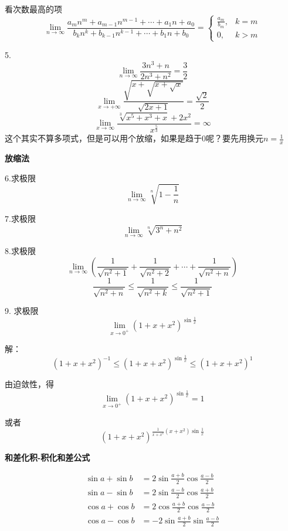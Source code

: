 \documentclass[12pt, a4paper]{ctexart}
\begin{document}
\begin{flushleft}
    看次数最高的项
    \[
    \lim _{n \rightarrow \infty} \frac{a_{m} n^{m}+a_{m-1} n^{m-1}+\cdots+a_{1} n+a_{0}}{b_{k} n^{k}+b_{k-1} n^{k-1}+\cdots+b_{1} n+b_{0}}=\left\{\begin{array}{ll}{\frac{a_{m}}{b_{m}},} & {k=m} \\ {0,} & {k>m}\end{array}\right.
    \] %

    5.
    \[\lim \limits _{n \rightarrow \infty} \frac{3n^3+n}{2n^3+n^2}=\frac{3}{2}\]
    \[\lim \limits _{x \rightarrow +\infty} \frac{\sqrt{x+\sqrt{x+\sqrt{x}}}}{\sqrt{2x+1}}=\frac{\sqrt{2}}{2}\]
    \[\lim \limits _{x \rightarrow \infty} \frac{\sqrt[3]{x^5+x^3+x}+2x^2}{x^{\frac{5}{3}}}=\infty\]
    这个其实不算多项式，但是可以用个放缩，如果是趋于0呢？要先用换元$n=\frac{1}{x}$

    {\bfseries 放缩法}

    6.求极限
    \[\lim \limits _{n \rightarrow \infty} \sqrt[n]{1-\frac{1}{n}}\]

    7.求极限\[
    \lim \limits _{n \rightarrow \infty} \sqrt[n]{3^n + n^2}
    \]


    8.求极限\[
    \lim \limits _{n \rightarrow \infty} \left(\frac{1}{\sqrt{n^2+1}} + \frac{1}{\sqrt{n^2+2}} + \cdots + \frac{1}{\sqrt{n^2+n}} \right)
    \]
    \[\frac{1}{\sqrt{n^2+n}} \leq \frac{1}{ \sqrt{n^2+k} } \leq \frac{1}{ \sqrt{n^2+1} }\]

    9. 求极限
    $$
    \lim _{x \rightarrow 0^{+}}\left(1+x+x^{2}\right)^{\sin \frac{1}{x}}
    $$

    解：
    \[
    \left(1+x+x^{2}\right)^{-1} \leqslant\left(1+x+x^{2}\right)^{\sin \frac{1}{x}} \leqslant\left(1+x+x^{2}\right)^{1}
    \]

    由迫敛性，得$$\lim _{x \rightarrow 0^{+}} (1+x+x^2)^{\sin \frac{1}{x}} = 1$$

    或者\[
    (1+x+x^2)^{\frac{1}{x+x^2}(x+x^2)\sin \frac{1}{x}}
    \]

    {\bfseries 和差化积-积化和差公式}

  
    \begin{align}
    \sin a + \sin b &= 2\sin \frac{a +b}{2} \cos \frac{a-b}{2} \\
    \sin a - \sin b &= 2\sin \frac{a - b}{2} \cos \frac{a + b}{2} \\
    \cos a + \cos b &= 2\cos \frac{a + b}{2} \cos \frac{a-b}{2} \\
    \cos a - \cos b &= -2\sin \frac{a+b}{2} \sin \frac{a-b}{2}
    \end{align}


\end{flushleft}
\end{document}
